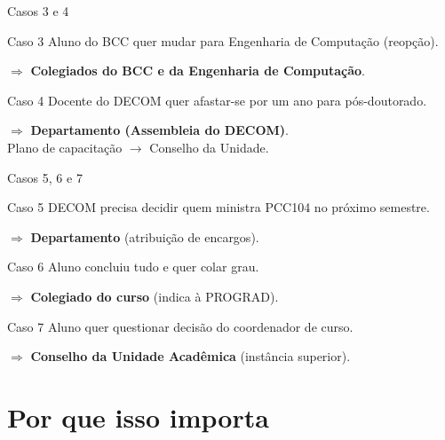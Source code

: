 \documentclass[aspectratio=169]{beamer}
\newcommand{\impt}[1]{\textcolor{maccent}{\textbf{#1}}}
\newcommand{\ntc}[1]{\textcolor{mprimary}{#1}}
\begin{document}
\begin{frame}{Casos 3 e 4}
  \begin{alertblock}{Caso 3}
    Aluno do BCC quer mudar para Engenharia de Computação (reopção).
  \end{alertblock}
   
  $\Rightarrow$ \impt{Colegiados do BCC e da Engenharia de Computação}.

  \vspace{0.5cm}
   
  \begin{alertblock}{Caso 4}
    Docente do DECOM quer afastar-se por um ano para pós-doutorado.
  \end{alertblock}
   
  $\Rightarrow$ \impt{Departamento (Assembleia do DECOM)}.\\
  \ntc{Plano de capacitação $\to$ Conselho da Unidade.}
\end{frame}

\begin{frame}{Casos 5, 6 e 7}
  \begin{alertblock}{Caso 5}
    DECOM precisa decidir quem ministra PCC104 no próximo semestre.
  \end{alertblock}
   
  $\Rightarrow$ \impt{Departamento} (atribuição de encargos).

  \vspace{0.3cm}
   
  \begin{alertblock}{Caso 6}
    Aluno concluiu tudo e quer colar grau.
  \end{alertblock}
   
  $\Rightarrow$ \impt{Colegiado do curso} (indica à PROGRAD).

  \vspace{0.3cm}
   
  \begin{alertblock}{Caso 7}
    Aluno quer questionar decisão do coordenador de curso.
  \end{alertblock}
   
  $\Rightarrow$ \impt{Conselho da Unidade Acadêmica} (instância superior).
\end{frame}

\section{Por que isso importa}
\end{document}
